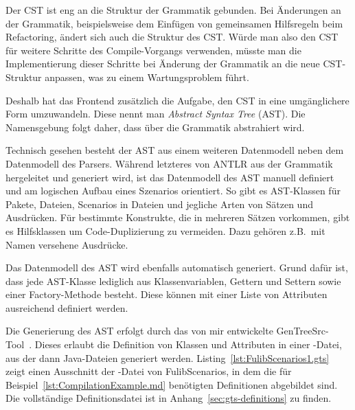 Der CST ist eng an die Struktur der Grammatik gebunden.
Bei Änderungen an der Grammatik, beispielsweise dem Einfügen von gemeinsamen Hilfsregeln beim Refactoring,
ändert sich auch die Struktur des CST\@.
Würde man also den CST für weitere Schritte des Compile-Vorgangs verwenden,
müsste man die Implementierung dieser Schritte bei Änderung der Grammatik an die neue CST-Struktur anpassen,
was zu einem Wartungsproblem führt.

Deshalb hat das Frontend zusätzlich die Aufgabe, den CST in eine umgänglichere Form umzuwandeln.
Diese nennt man \emph{Abstract Syntax Tree} (AST).
Die Namensgebung folgt daher, dass über die Grammatik abstrahiert wird.

Technisch gesehen besteht der AST aus einem weiteren Datenmodell neben dem Datenmodell des Parsers.
Während letzteres von ANTLR aus der Grammatik hergeleitet und generiert wird,
ist das Datenmodell des AST manuell definiert und am logischen Aufbau eines Szenarios orientiert.
So gibt es AST-Klassen für Pakete, Dateien, Scenarios in Dateien und jegliche Arten von Sätzen und Ausdrücken.
Für bestimmte Konstrukte, die in mehreren Sätzen vorkommen, gibt es Hilfsklassen um Code-Duplizierung zu vermeiden.
Dazu gehören z.B.\ mit Namen versehene Ausdrücke.

Das Datenmodell des AST wird ebenfalls automatisch generiert.
Grund dafür ist, dass jede AST-Klasse lediglich aus Klassenvariablen, Gettern und Settern sowie einer Factory-Methode besteht.
Diese können mit einer Liste von Attributen ausreichend definiert werden.

Die Generierung des AST erfolgt durch das von mir entwickelte GenTreeSrc-Tool~\cite{gentreesrc}.
Dieses erlaubt die Definition von Klassen und Attributen in einer -Datei,
aus der dann Java-Dateien generiert werden.
Listing~\ref{lst:FulibScenarios1.gts} zeigt einen Ausschnitt der -Datei von FulibScenarios,
in dem die für Beispiel~\ref{lst:CompilationExample.md} benötigten Definitionen abgebildet sind.
Die vollständige Definitionsdatei ist in Anhang~\ref{sec:gts-definitions} zu finden.


